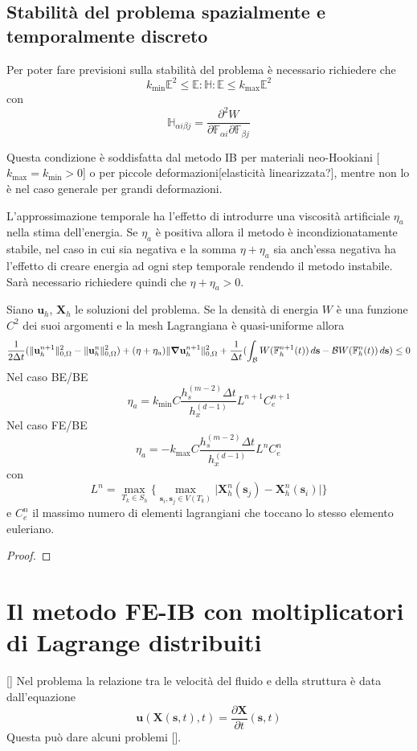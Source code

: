 \subsection{Stabilità del problema spazialmente e temporalmente discreto}

Per poter fare previsioni sulla stabilità del problema è necessario richiedere che
$${k}_\text{min}\mathbb{E}^2\leq\mathbb{E}\mathbf{:}\mathbb{H}\mathbf{:}\mathbb{E}\leq{k}_\text{max}\mathbb{E}^2$$
con
$$\mathbb{H}_{\alpha i\beta j}=\frac{\partial^2 W}{\partial\mathbb{F}_{\alpha i}\partial\mathbb{F}_{\beta j}}$$

Questa condizione è soddisfatta dal metodo IB per materiali neo-Hookiani [${k}_\text{max}={k}_\text{min}>0$] o per piccole deformazioni[elasticità linearizzata?], mentre non lo è nel caso generale per grandi deformazioni.

L'approssimazione temporale ha l'effetto di introdurre una viscosità artificiale $\eta_a$ nella stima dell'energia. Se $\eta_a$ è positiva allora il metodo è incondizionatamente stabile, nel caso in cui sia negativa e la somma $\eta+\eta_a$ sia anch'essa negativa ha l'effetto di creare energia ad ogni step temporale rendendo il metodo instabile. Sarà necessario richiedere quindi che $\eta+\eta_a>0$.

\begin{theorem}
Siano $\mathbf{u}_h$, $\mathbf{X}_h$ le soluzioni del problema. Se la densità di energia $W$ è una funzione $C^2$ dei suoi argomenti e la mesh Lagrangiana è quasi-uniforme allora
$$\frac{1}{2\Delta t}(\Vert\mathbf{u}^{n+1}_h\Vert^2_{0,\Omega}-\Vert\mathbf{u}^{n}_h\Vert^2_{0,\Omega})+(\eta+\eta_a)\Vert\boldsymbol{\nabla}\mathbf{u}^{n+1}_h\Vert^2_{0,\Omega}+\frac{1}{\Delta t}(\int_{\mathcal{B}}W(\mathbb{F}^{n+1}_h(t))\,d\mathbf{s}-\mathcal{B}W(\mathbb{F}^{n}_h(t))\,d\mathbf{s})\leq 0$$
Nel caso BE/BE
$$\eta_a=k_\text{min}C\frac{h_s^{(m-2)}\Delta t}{h_x^{(d-1)}}L^{n+1}C_e^{n+1}$$
Nel caso FE/BE
$$\eta_a=-k_\text{max}C\frac{h_s^{(m-2)}\Delta t}{h_x^{(d-1)}}L^nC_e^n$$
con $$L^n=\max_{T_k\in S_h} \{ \max_{\mathbf{s}_i,\mathbf{s}_j\in V(T_k)} \vert \mathbf{X}^n_h(\mathbf{s}_j) - \mathbf{X}^n_h(\mathbf{s}_i) \vert \}$$
e $C_e^n$ il massimo numero di elementi lagrangiani che toccano lo stesso elemento euleriano.
\end{theorem}
\begin{proof}
\end{proof}

\section{Il metodo FE-IB con moltiplicatori di Lagrange distribuiti}
[]
Nel problema la relazione tra le velocità  del fluido e della struttura è data dall'equazione
$$\mathbf{u}(\mathbf{X}(\mathbf{s},t),t)=\frac{\partial \mathbf{X}}{\partial t}(\mathbf{s},t)$$
Questa può dare alcuni problemi [].

